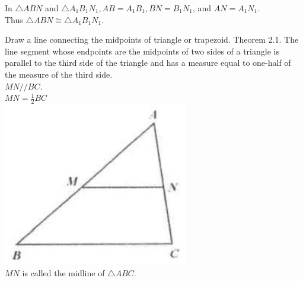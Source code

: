 \documentclass[10pt]{article}
\begin{document}
In \(\triangle A B N\) and \(\triangle A_{1} B_{1} N_{1}, A B=A_{1} B_{1}, B N=B_{1} N_{1}\), and \(A N=A_{1} N_{1}\).\\
Thus \(\triangle A B N \cong \triangle A_{1} B_{1} N_{1}\).

Draw a line connecting the midpoints of triangle or trapezoid.
Theorem 2.1. The line segment whose endpoints are the midpoints of two sides of a triangle is parallel to the third side of the triangle and has a measure equal to one-half of the measure of the third side.\\
\(M N / / B C\).\\
\(M N=\frac{1}{2} B C\)\\
\includegraphics[max width=\textwidth, center]{2025_04_17_97bc1f7e44d93c271a88g-032(2)}\\
\(M N\) is called the midline of \(\triangle A B C\).
\end{document}
